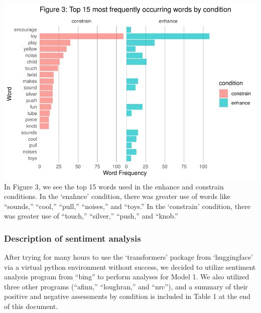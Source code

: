 \documentclass[
  english,
  man]{apa6}
\begin{document}
\includegraphics{capstone640_files/figure-latex/unnamed-chunk-1-1.pdf}
In Figure 3, we see the top 15 words used in the enhance and constrain
conditions. In the `enahnce' condition, there was greater use of words like ``sounds,'' ``cool,'' ``pull,'' ``noises,'' and ``toys.'' In the `constrain' condition, there was greater use of ``touch,'' ``silver,'' ``push,'' and ``knob.''

\hypertarget{description-of-sentiment-analysis}{%
\subsubsection{Description of sentiment analysis}\label{description-of-sentiment-analysis}}

After trying for many hours to use the `transformers' package from `huggingface' via
a virtual python environment without success, we decided to utilize sentiment
analysis program from ``bing'' to perform analyses for Model 1. We also utilized three
other programs (``afinn,'' ``loughran,'' and ``nrc''), and a summary of their positive and
negative assessments by condition is included in Table 1 at the end of this
document.
\end{document}
